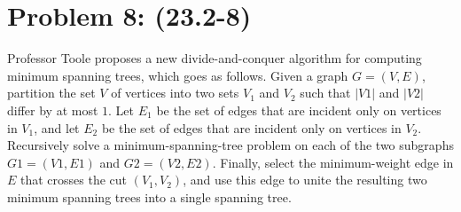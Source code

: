 \documentclass[a4paper]{article}
\begin{document}
\section*{Problem 8: (23.2-8)} Professor Toole proposes a new divide-and-conquer algorithm for computing minimum spanning trees, which goes as follows. Given a graph $G = (V, E)$, partition the set $V$ of vertices into two sets $V_1$ and $V_2$ such that $|V1|$ and $|V2|$ differ by at most $1$. Let $E_1$ be the set of edges that are incident only on vertices in $V_1$, and let $E_2$ be the set of edges that are incident only on vertices in $V_2$. Recursively solve a minimum-spanning-tree problem on each of the two subgraphs $G1 = (V1, E1)$ and $G2 = (V2, E2)$. Finally, select the minimum-weight edge in $E$ that crosses the cut $(V_1, V_2)$, and use this edge to unite the resulting two minimum spanning
trees into a single spanning tree.
\end{document}
